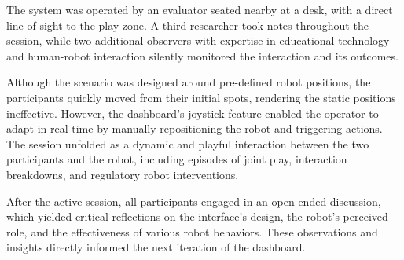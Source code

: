 \documentclass[a4paper]{usiinfbachelorproject}
\begin{document}
The system was operated by an evaluator seated nearby at a desk, with a direct line of sight to the play zone.
A third researcher took notes throughout the session, while two additional observers with expertise in educational technology and human-robot interaction silently monitored the interaction and its outcomes.

Although the scenario was designed around pre-defined robot positions, the participants quickly moved from their initial spots, rendering the static positions ineffective.
However, the dashboard's joystick feature enabled the operator to adapt in real time by manually repositioning the robot and triggering actions.
The session unfolded as a dynamic and playful interaction between the two participants and the robot, including episodes of joint play, interaction breakdowns, and regulatory robot interventions.

After the active session, all participants engaged in an open-ended discussion, which yielded critical reflections on the interface's design, the robot's perceived role, and the effectiveness of various robot behaviors.
These observations and insights directly informed the next iteration of the dashboard.
\end{document}
